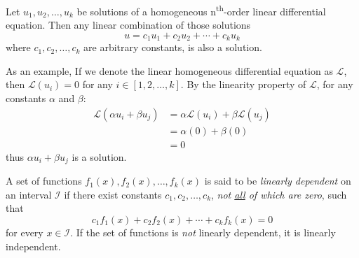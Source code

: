 \begin{theorem}
Let $u_1,u_2,\dots,u_k$ be solutions of a homogeneous n\textsuperscript{th}-order linear differential equation.  Then any linear combination of those solutions 
$$u = c_1u_1+c_2u_2+\cdots+c_ku_k$$where $c_1,c_2,\dots,c_k$ are arbitrary constants, is also a solution.
\end{theorem}
As an example, If we denote the linear homogeneous differential equation as $\mathcal{L}$, then $\mathcal{L}(u_i) = 0$ for any $i \in [1,2,\dots,k]$.  By the linearity property of $\mathcal{L}$, for any constants $\alpha$ and $\beta$:
\begin{align*}
\mathcal{L}(\alpha u_i + \beta u_j) &=  \alpha \mathcal{L}(u_i) + \beta \mathcal{L}(u_j)\\
&= \alpha(0) + \beta(0) \\
&= 0
\end{align*}
thus $\alpha u_i + \beta u_j$ is a solution.

\begin{theorem}
A set of functions $f_1(x),f_2(x),\dots,f_k(x)$ is said to be \emph{linearly dependent} on an interval $\mathcal{I}$ if there exist constants $c_1,c_2,\dots,c_k$, \emph{not \underline{all} of which are zero}, such that
$$c_1f_1(x) + c_2f_2(x)+\cdots+c_kf_k(x) = 0$$
\noindent for every $x \in \mathcal{I}$.  If the set of functions is \emph{not} linearly dependent, it is linearly independent.
\label{th:linear-dep}
\end{theorem} 



